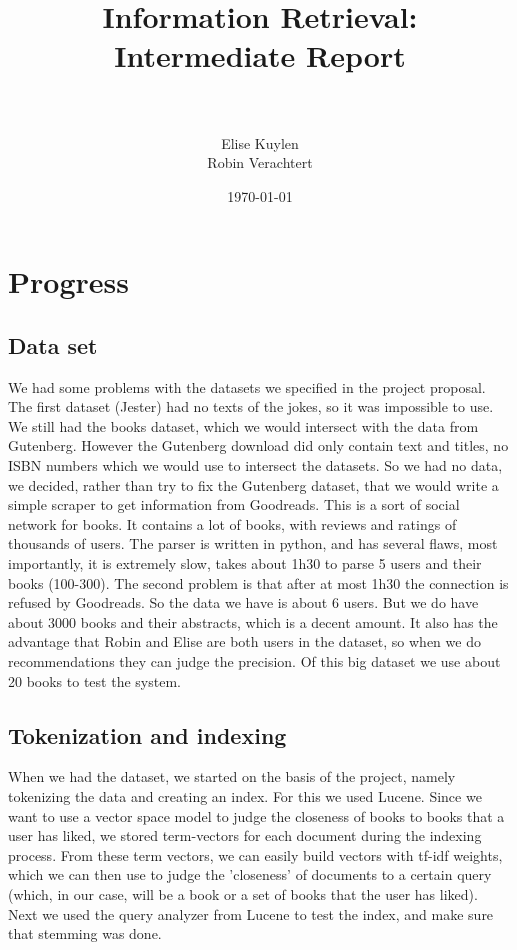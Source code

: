 \documentclass{scrartcl}
\title{
    \normalfont \huge
    {Information Retrieval: Intermediate Report} \\ %
    \horrule{2pt} \\[0.5cm] %
}
\author{Elise Kuylen\\ Robin Verachtert}
\date{\normalsize\today}
\begin{document}
\maketitle
\section{Progress}
\subsection{Data set}
We had some problems with the datasets we specified in the project proposal. The first dataset (Jester) had no texts of the jokes, so it was impossible to use.\\
We still had the books dataset, which we would intersect with the data from Gutenberg. However the Gutenberg download did only contain text and titles, no ISBN numbers which we would use to intersect the datasets. So we had no data, we decided, rather than try to fix the Gutenberg dataset, that we would write a simple scraper to get information from Goodreads. This is a sort of social network for books. It contains a lot of books, with reviews and ratings of thousands of users. The parser is written in python, and has several flaws, most importantly, it is extremely slow, takes about 1h30 to parse 5 users and their books (100-300). The second problem is that after at most 1h30 the connection is refused by Goodreads. So the data we have is about 6 users. But we do have about 3000 books and their abstracts, which is a decent amount. It also has the advantage that Robin and Elise are both users in the dataset, so when we do recommendations they can judge the precision. Of this big dataset we use about 20 books to test the system.

\subsection{Tokenization and indexing}
When we had the dataset, we started on the basis of the project, namely tokenizing the data and creating an index. For this we used Lucene. 
Since we want to use a vector space model to judge the closeness of books to books that a user has liked, we stored term-vectors for each document during the indexing process. From these term vectors, we can easily build vectors with tf-idf weights, which we can then use to judge the 'closeness' of documents to a certain query (which, in our case, will be a book or a set of books that the user has liked).\\ 
Next we used the query analyzer from Lucene to test the index, and make sure that stemming was done.
\end{document}
